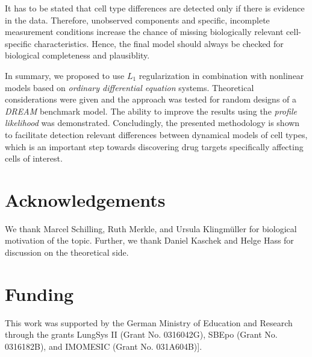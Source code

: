\documentclass{bioinfo}
\begin{document}
It has to be stated that cell type differences are detected only if there is evidence in the data.
Therefore, unobserved components and specific, incomplete measurement conditions increase the chance of missing biologically relevant cell-specific characteristics.
Hence, the final model should always be checked for biological completeness and plausiblity.

In summary, we proposed to use $L_1$ regularization in combination with nonlinear models based on \emph{ordinary differential equation} systems.
Theoretical considerations were given and the approach was tested for random designs of a \emph{DREAM} benchmark model.
The ability to improve the results using the \emph{profile likelihood} was demonstrated.
Concludingly, the presented methodology is shown to facilitate detection relevant differences between dynamical models of cell types, which is an important step towards discovering drug targets specifically affecting cells of interest.

\section*{Acknowledgements}

We thank Marcel Schilling, Ruth Merkle, and Ursula Klingm{\"u}ller for biological motivation of the topic.
Further, we thank Daniel Kaschek and Helge Hass for discussion on the theoretical side.

\section*{Funding}

This work was supported by the German Ministry of Education and Research through the grants LungSys II (Grant No. 0316042G), SBEpo (Grant No. 0316182B), and IMOMESIC (Grant No. 031A604B)]. 


%
%
%
% 

% 


\end{document}
